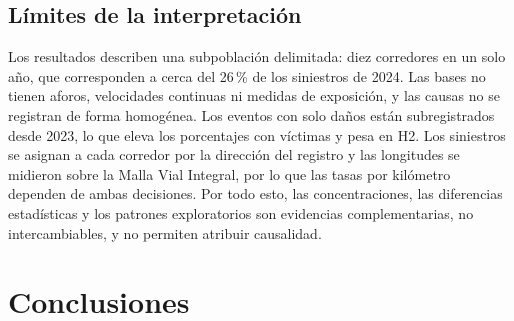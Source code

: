 \documentclass[12pt,letterpaper]{article}
\begin{document}
\subsection{Límites de la interpretación}

Los resultados describen una subpoblación delimitada: diez corredores
en un solo año, que corresponden a cerca del 26\,\% de los siniestros
de 2024. Las bases no tienen aforos, velocidades continuas ni medidas
de exposición, y las causas no se registran de forma homogénea. Los
eventos con solo daños están subregistrados desde 2023, lo que eleva los
porcentajes con víctimas y pesa en H2. Los siniestros se asignan a cada
corredor por la dirección del registro y las longitudes se midieron
sobre la Malla Vial Integral, por lo que las tasas por kilómetro
dependen de ambas decisiones. Por todo esto, las concentraciones, las
diferencias estadísticas y los patrones exploratorios son evidencias
complementarias, no intercambiables, y no permiten atribuir causalidad.

\clearpage

\section{Conclusiones}
\end{document}
